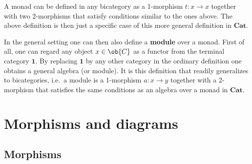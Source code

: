     \begin{remark}
        A monad can be defined in any bicategory as a 1-morphism $t:x\rightarrow x$ together with two 2-morphisms that satisfy conditions similar to the ones above. The above definition is then just a specific case of this more general definition in $\mathbf{Cat}$.

        In the general setting one can then also define a \textbf{module} over a monad. First of all, one can regard any object $x\in\ob{C}$ as a functor from the terminal category $\mathbf{1}$. By replacing $\mathbf{1}$ by any other category in the ordinary definition one obtains a general algebra (or module). It is this definition that readily generalizes to bicategories, i.e.~a module is a 1-morphism $a:x\rightarrow y$ together with a 2-morphism that satisfies the same conditions as an algebra over a monad in $\mathbf{Cat}$.
    \end{remark}

\section{Morphisms and diagrams}\label{section:morphisms}
\subsection{Morphisms}



